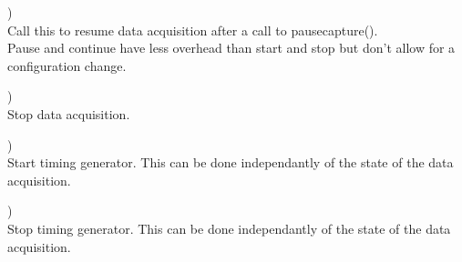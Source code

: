 		\device)\\
		Call this to resume data acquisition after a call to \textsf{\prefix pause\tu capture()}.\\
		Pause and continue have less overhead than start and stop but don't allow for a configuration change.\par

		\device)\\
		Stop data acquisition.\par

		\device)\\
		Start timing generator. This can be done independantly of the state of the data acquisition.\par

		\device)\\
		Stop timing generator. This can be done independantly of the state of the data acquisition.\par

	
